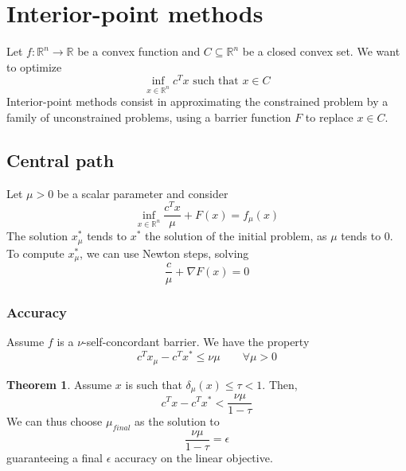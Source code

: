 \documentclass[12pt, openany]{report}
\newcommand{\R}{\mathbb{R}}
\theoremstyle{definition}
\newtheorem{thm}{Theorem}[chapter]
\begin{document}
\section{Interior-point methods}
Let $f:\R^n\rightarrow \R$ be a convex function and $C\subseteq \R^n$ be a closed convex set. We want to optimize 
\begin{equation}
    \inf_{x\in \R^n} c^Tx \text{ such that }x\in C 
\end{equation}
Interior-point methods consist in approximating the constrained problem by a family of unconstrained problems, using a barrier function $F$ to replace $x\in C$. 
\subsection{Central path}
Let $\mu>0$ be a scalar parameter and consider 
\begin{equation}\label{eq:central_path}
    \inf_{x\in \R^n} \frac{c^Tx}{\mu} + F(x) = f_\mu(x)
\end{equation}
The solution $x_\mu^*$ tends to $x^*$ the solution of the initial problem, as $\mu$ tends to 0. \\

To compute $x_\mu^*$, we can use Newton steps, solving 
\begin{equation}
    \frac{c}{\mu}+\nabla F(x) = 0
\end{equation}
\subsubsection{Accuracy}
Assume $f$ is a $\nu$-self-concordant barrier. We have the property 
\begin{equation}
    c^Tx_\mu -c^T x^* \le \nu \mu \qquad \forall \mu>0
\end{equation}
\begin{thm}
    Assume $x$ is such that $\delta_\mu(x)\le \tau <1$. Then,
    \begin{equation}
        c^Tx-c^Tx^* <\frac{\nu \mu}{1-\tau}
    \end{equation}
    We can thus choose $\mu_{final}$ as the solution to 
    \begin{equation}
        \frac{\nu\mu}{1-\tau} = \epsilon
    \end{equation}
    guaranteeing a final $\epsilon$ accuracy on the linear objective.
\end{thm}
\end{document}
